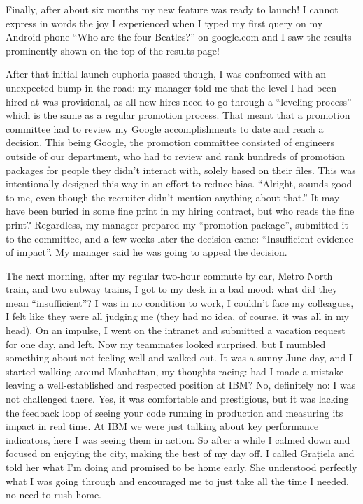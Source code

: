 \documentclass[12pt]{book}
\begin{document}
Finally, after about six months my new feature was ready to launch! I
cannot express in words the joy I experienced when I typed my first
query on my Android phone ``Who are the four Beatles?'' on google.com
and I saw the results prominently shown on the top of the results page!

After that initial launch euphoria passed though, I was confronted with
an unexpected bump in the road: my manager told me that the level I had
been hired at was provisional, as all new hires need to go through a
``leveling process'' which is the same as a regular promotion process.
That meant that a promotion committee had to review my Google
accomplishments to date and reach a decision. This being Google, the
promotion committee consisted of engineers outside of our department,
who had to review and rank hundreds of promotion packages for people
they didn't interact with, solely based on their files. This was
intentionally designed this way in an effort to reduce bias. ``Alright,
sounds good to me, even though the recruiter didn't mention anything
about that.'' It may have been buried in some fine print in my hiring
contract, but who reads the fine print? Regardless, my manager prepared
my ``promotion package'', submitted it to the committee, and a few weeks
later the decision came: ``Insufficient evidence of impact''. My manager
said he was going to appeal the decision.

The next morning, after my regular two-hour commute by car, Metro North
train, and two subway trains, I got to my desk in a bad mood: what did
they mean ``insufficient''? I was in no condition to work, I couldn't
face my colleagues, I felt like they were all judging me (they had no
idea, of course, it was all in my head). On an impulse, I went on the
intranet and submitted a vacation request for one day, and left. Now my
teammates looked surprised, but I mumbled something about not feeling
well and walked out. It was a sunny June day, and I started walking
around Manhattan, my thoughts racing: had I made a mistake leaving a
well-established and respected position at IBM? No, definitely no: I was
not challenged there. Yes, it was comfortable and prestigious, but it
was lacking the feedback loop of seeing your code running in production
and measuring its impact in real time. At IBM we were just talking about
key performance indicators, here I was seeing them in action. So after a
while I calmed down and focused on enjoying the city, making the best of
my day off. I called Grațiela and told her what I'm doing and promised
to be home early. She understood perfectly what I was going through and
encouraged me to just take all the time I needed, no need to rush home.
\end{document}
